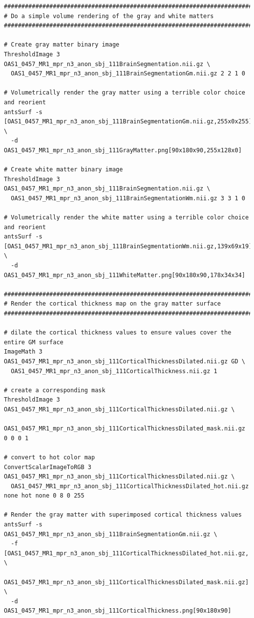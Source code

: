\documentclass{InsightArticle}
\begin{document}
\begin{lstlisting}
##############################################################################
# Do a simple volume rendering of the gray and white matters
##############################################################################

# Create gray matter binary image
ThresholdImage 3 OAS1_0457_MR1_mpr_n3_anon_sbj_111BrainSegmentation.nii.gz \
  OAS1_0457_MR1_mpr_n3_anon_sbj_111BrainSegmentationGm.nii.gz 2 2 1 0

# Volumetrically render the gray matter using a terrible color choice and reorient
antsSurf -s [OAS1_0457_MR1_mpr_n3_anon_sbj_111BrainSegmentationGm.nii.gz,255x0x255] \
  -d OAS1_0457_MR1_mpr_n3_anon_sbj_111GrayMatter.png[90x180x90,255x128x0]

# Create white matter binary image
ThresholdImage 3 OAS1_0457_MR1_mpr_n3_anon_sbj_111BrainSegmentation.nii.gz \
  OAS1_0457_MR1_mpr_n3_anon_sbj_111BrainSegmentationWm.nii.gz 3 3 1 0

# Volumetrically render the white matter using a terrible color choice and reorient
antsSurf -s [OAS1_0457_MR1_mpr_n3_anon_sbj_111BrainSegmentationWm.nii.gz,139x69x19] \
  -d  OAS1_0457_MR1_mpr_n3_anon_sbj_111WhiteMatter.png[90x180x90,178x34x34]

##############################################################################
# Render the cortical thickness map on the gray matter surface
##############################################################################

# dilate the cortical thickness values to ensure values cover the entire GM surface
ImageMath 3 OAS1_0457_MR1_mpr_n3_anon_sbj_111CorticalThicknessDilated.nii.gz GD \
  OAS1_0457_MR1_mpr_n3_anon_sbj_111CorticalThickness.nii.gz 1

# create a corresponding mask
ThresholdImage 3 OAS1_0457_MR1_mpr_n3_anon_sbj_111CorticalThicknessDilated.nii.gz \
  OAS1_0457_MR1_mpr_n3_anon_sbj_111CorticalThicknessDilated_mask.nii.gz 0 0 0 1

# convert to hot color map
ConvertScalarImageToRGB 3 OAS1_0457_MR1_mpr_n3_anon_sbj_111CorticalThicknessDilated.nii.gz \
  OAS1_0457_MR1_mpr_n3_anon_sbj_111CorticalThicknessDilated_hot.nii.gz none hot none 0 8 0 255
  
# Render the gray matter with superimposed cortical thickness values
antsSurf -s OAS1_0457_MR1_mpr_n3_anon_sbj_111BrainSegmentationGm.nii.gz \
  -f [OAS1_0457_MR1_mpr_n3_anon_sbj_111CorticalThicknessDilated_hot.nii.gz, \
      OAS1_0457_MR1_mpr_n3_anon_sbj_111CorticalThicknessDilated_mask.nii.gz] \
  -d  OAS1_0457_MR1_mpr_n3_anon_sbj_111CorticalThickness.png[90x180x90]
\end{lstlisting}  
\end{document}
